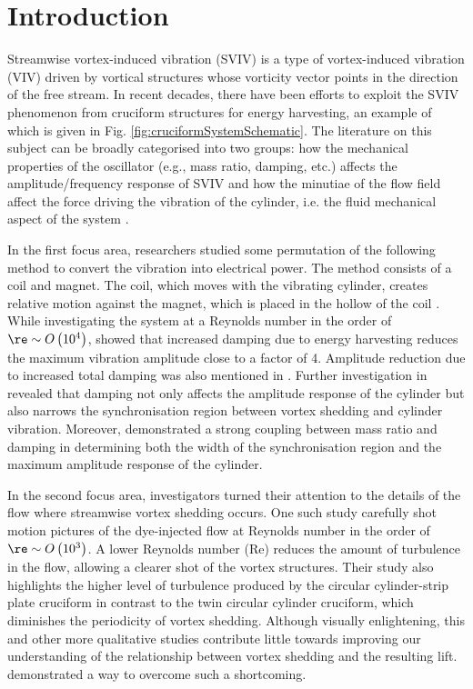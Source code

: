 \documentclass[a4paper,fleqn]{cas-sc}
\begin{document}
\section{Introduction} \label{sec:intro}
Streamwise vortex-induced vibration (SVIV) is a type of vortex-induced vibration (VIV) driven by vortical structures whose vorticity vector points in the direction of the free stream. In recent decades, there have been efforts to exploit the SVIV phenomenon from cruciform structures for energy harvesting, an example of which is given in Fig. \ref{fig:cruciformSystemSchematic}. The literature on this subject can be broadly categorised into two groups: how the mechanical properties of the oscillator (e.g., mass ratio, damping, etc.) affects the amplitude/frequency response of SVIV \citep{Koide2009,Koide2013,Nguyen2012} and how the minutiae of the flow field affect the force driving the vibration of the cylinder, i.e. the fluid mechanical aspect of the system \citep{Deng2007,Koide2017,Zhao2018a}.

In the first focus area, researchers studied some permutation of the following method to convert the vibration into electrical power. The method consists of a coil and magnet. The coil, which moves with the vibrating cylinder, creates relative motion against the magnet, which is placed in the hollow of the coil \citep{Koide2009}. While investigating the system at a Reynolds number in the order of $\re \sim O \left( 10^{4} \right)$, \citet{Koide2009} showed that increased damping due to energy harvesting reduces the maximum vibration amplitude close to a factor of 4. Amplitude reduction due to increased total damping was also mentioned in \citet{Bernitsas2008a,Bernitsas2008b,Bernitsas2009}. Further investigation in \citet{Nguyen2012} revealed that damping not only affects the amplitude response of the cylinder but also narrows the synchronisation region between vortex shedding and cylinder vibration. Moreover, \citet{Nguyen2012} demonstrated a strong coupling between mass ratio and damping in determining both the width of the synchronisation region and the maximum amplitude response of the cylinder.

In the second focus area, investigators turned their attention to the details of the flow where streamwise vortex shedding occurs. One such study carefully shot motion pictures of the dye-injected flow \citep{Koide2017} at Reynolds number in the order of $\re \sim O\left( 10^{3} \right)$. A lower Reynolds number (Re) reduces the amount of turbulence in the flow, allowing a clearer shot of the vortex structures. Their study also highlights the higher level of turbulence produced by the circular cylinder-strip plate cruciform in contrast to the twin circular cylinder cruciform, which diminishes the periodicity of vortex shedding. Although visually enlightening, this and other more qualitative studies contribute little towards improving our understanding of the relationship between vortex shedding and the resulting lift. \citet{Deng2007} demonstrated a way to overcome such a shortcoming.
\end{document}
